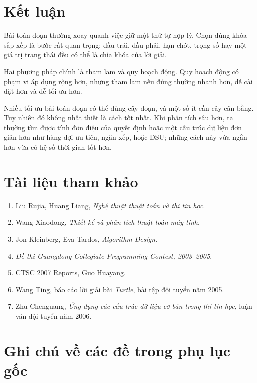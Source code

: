 \documentclass[11pt]{article}
\begin{document}
\section*{Kết luận}

Bài toán đoạn thường xoay quanh việc giữ một thứ tự hợp lý. Chọn đúng khóa sắp
xếp là bước rất quan trọng: đầu trái, đầu phải, hạn chót, trọng số hay một giá
trị trạng thái đều có thể là chìa khóa của lời giải.

Hai phương pháp chính là tham lam và quy hoạch động. Quy hoạch động có phạm vi
áp dụng rộng hơn, nhưng tham lam nếu đúng thường nhanh hơn, dễ cài đặt hơn và
dễ tối ưu hơn.

Nhiều tối ưu bài toán đoạn có thể dùng cây đoạn, và một số ít cần cây cân
bằng. Tuy nhiên đó không nhất thiết là cách tốt nhất. Khi phân tích sâu hơn,
ta thường tìm được tính đơn điệu của quyết định hoặc một cấu trúc dữ liệu đơn
giản hơn như hàng đợi ưu tiên, ngăn xếp, hoặc DSU; những cách này vừa ngắn hơn
vừa có hệ số thời gian tốt hơn.

\section*{Tài liệu tham khảo}

\begin{enumerate}
  \item Liu Rujia, Huang Liang, \textit{Nghệ thuật thuật toán và thi tin học}.
  \item Wang Xiaodong, \textit{Thiết kế và phân tích thuật toán máy tính}.
  \item Jon Kleinberg, Eva Tardos, \textit{Algorithm Design}.
  \item \textit{Đề thi Guangdong Collegiate Programming Contest, 2003--2005}.
  \item CTSC 2007 Reports, Guo Huayang.
  \item Wang Ting, báo cáo lời giải bài \textit{Turtle}, bài tập đội tuyển
  năm 2005.
  \item Zhu Chenguang, \textit{Ứng dụng các cấu trúc dữ liệu cơ bản trong thi
  tin học}, luận văn đội tuyển năm 2006.
\end{enumerate}

\appendix
\section{Ghi chú về các đề trong phụ lục gốc}
\end{document}
